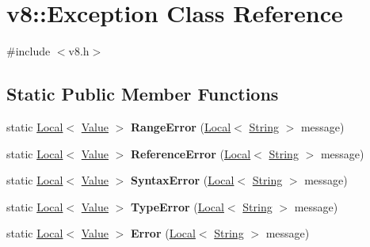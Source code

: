 \hypertarget{classv8_1_1Exception}{}\section{v8\+:\+:Exception Class Reference}
\label{classv8_1_1Exception}


{\ttfamily \#include $<$v8.\+h$>$}

\subsection*{Static Public Member Functions}
\begin{DoxyCompactItemize}
\item 
\mbox{\label{classv8_1_1Exception_a7fff335c54b4a267b5edab00ca049294}} 
static \mbox{\hyperlink{classv8_1_1Local}{Local}}$<$ \mbox{\hyperlink{classv8_1_1Value}{Value}} $>$ {\bfseries Range\+Error} (\mbox{\hyperlink{classv8_1_1Local}{Local}}$<$ \mbox{\hyperlink{classv8_1_1String}{String}} $>$ message)
\item 
\mbox{\label{classv8_1_1Exception_aa9a1b1806c6ec13e0e8852a05e83f8ef}} 
static \mbox{\hyperlink{classv8_1_1Local}{Local}}$<$ \mbox{\hyperlink{classv8_1_1Value}{Value}} $>$ {\bfseries Reference\+Error} (\mbox{\hyperlink{classv8_1_1Local}{Local}}$<$ \mbox{\hyperlink{classv8_1_1String}{String}} $>$ message)
\item 
\mbox{\label{classv8_1_1Exception_ae9efc01a15b3ea6ed0761ce4b2cfa4ab}} 
static \mbox{\hyperlink{classv8_1_1Local}{Local}}$<$ \mbox{\hyperlink{classv8_1_1Value}{Value}} $>$ {\bfseries Syntax\+Error} (\mbox{\hyperlink{classv8_1_1Local}{Local}}$<$ \mbox{\hyperlink{classv8_1_1String}{String}} $>$ message)
\item 
\mbox{\label{classv8_1_1Exception_ad06cda3370edb5b39a5c671bba28754d}} 
static \mbox{\hyperlink{classv8_1_1Local}{Local}}$<$ \mbox{\hyperlink{classv8_1_1Value}{Value}} $>$ {\bfseries Type\+Error} (\mbox{\hyperlink{classv8_1_1Local}{Local}}$<$ \mbox{\hyperlink{classv8_1_1String}{String}} $>$ message)
\item 
\mbox{\label{classv8_1_1Exception_a77c6ab659f67df0cb0aa0f7c6698f019}} 
static \mbox{\hyperlink{classv8_1_1Local}{Local}}$<$ \mbox{\hyperlink{classv8_1_1Value}{Value}} $>$ {\bfseries Error} (\mbox{\hyperlink{classv8_1_1Local}{Local}}$<$ \mbox{\hyperlink{classv8_1_1String}{String}} $>$ message)

\end{DoxyCompactItemize}

